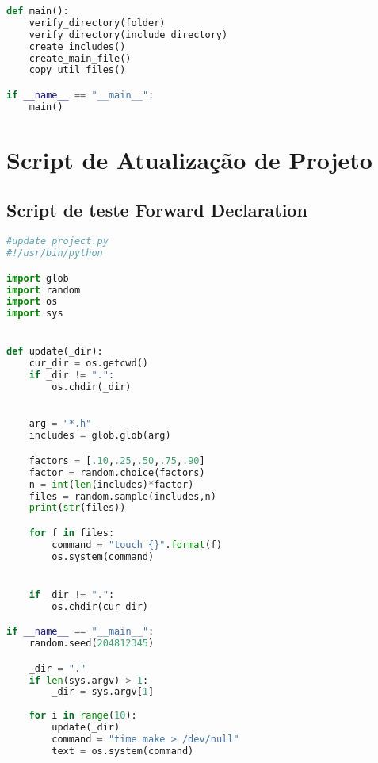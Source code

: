 \begin{apendicesenv}
\begin{lstlisting}[language=Python,caption={
     Script Redundancia de Guardas de Inclusão},
                 label=script_redundante_include]
def main():
    verify_directory(folder)
    verify_directory(include_directory)
    create_includes()
    create_main_file()
    copy_util_files()

if __name__ == "__main__":
    main()
\end{lstlisting}

\chapter{Script de Atualização de Projeto}



\section{Script de teste Forward Declaration}

\begin{lstlisting}[language=Python,caption={
   Script de teste de Projeto Forward Declaration},
                  label=script_forward_declaration]
#update project.py
#!/usr/bin/python

import glob
import random
import os
import sys


def update(_dir):
    cur_dir = os.getcwd()
    if _dir != ".":
        os.chdir(_dir)
    

    arg = "*.h"
    includes = glob.glob(arg)

    factors = [.10,.25,.50,.75,.90]
    factor = random.choice(factors)
    n = int(len(includes)*factor)
    files = random.sample(includes,n)
    print(str(files))

    for f in files:
        command = "touch {}".format(f)
        os.system(command)


    if _dir != ".":
        os.chdir(cur_dir)

if __name__ == "__main__":
    random.seed(204812345)

    _dir = "."
    if len(sys.argv) > 1:
        _dir = sys.argv[1]
    
    for i in range(10):
        update(_dir)
        command = "time make > /dev/null"
        text = os.system(command)
\end{lstlisting}
\end{apendicesenv}
